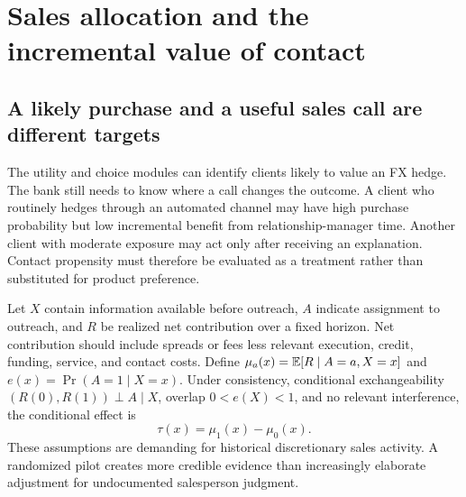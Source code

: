 \chapter{Sales allocation and the incremental value of contact}
\label{ch:outreach}
\section{A likely purchase and a useful sales call are different targets}
The utility and choice modules can identify clients likely to value an FX hedge. The bank still needs to know where a call changes the outcome. A client who routinely hedges through an automated channel may have high purchase probability but low incremental benefit from relationship-manager time. Another client with moderate exposure may act only after receiving an explanation. Contact propensity must therefore be evaluated as a treatment rather than substituted for product preference.

Let $X$ contain information available before outreach, $A$ indicate assignment to outreach, and $R$ be realized net contribution over a fixed horizon. Net contribution should include spreads or fees less relevant execution, credit, funding, service, and contact costs. Define $\mu_a(x)=\mathbb E[R\mid A=a,X=x]$ and $e(x)=\Pr(A=1\mid X=x)$. Under consistency, conditional exchangeability $(R(0),R(1))\perp A\mid X$, overlap $0<e(X)<1$, and no relevant interference, the conditional effect is
\begin{equation}
\tau(x)=\mu_1(x)-\mu_0(x).
\end{equation}
These assumptions are demanding for historical discretionary sales activity. A randomized pilot creates more credible evidence than increasingly elaborate adjustment for undocumented salesperson judgment.

